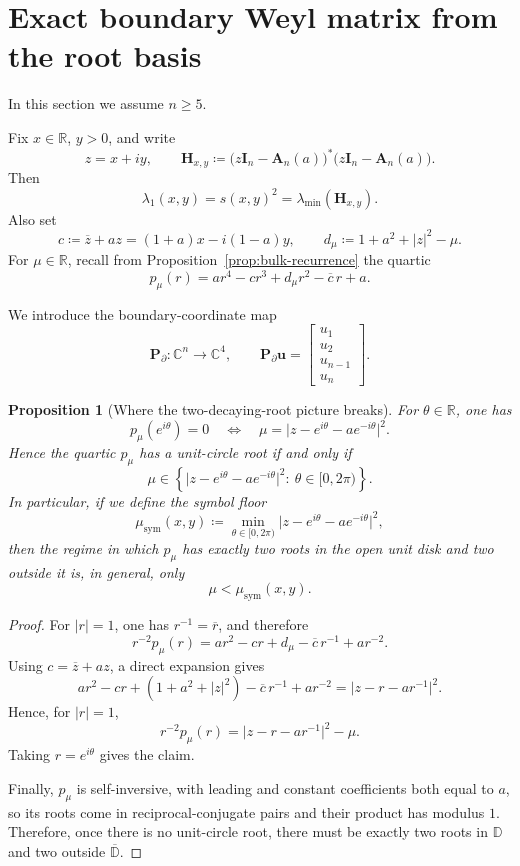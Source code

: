 \documentclass[11pt]{article}
\newtheorem{proposition}[theorem]{Proposition}
\begin{document}
\section{Exact boundary Weyl matrix from the root basis}

In this section we assume \(n\ge 5\).

Fix \(x\in\mathbb R\), \(y>0\), and write
\[
z=x+iy,
\qquad
\mathbf H_{x,y}
\coloneqq
\bigl(z\mathbf I_n-\mathbf A_n(a)\bigr)^*\bigl(z\mathbf I_n-\mathbf A_n(a)\bigr).
\]
Then
\[
\lambda_1(x,y)=s(x,y)^2=\lambda_{\min}(\mathbf H_{x,y}).
\]
Also set
\[
c\coloneqq \overline z + a z = (1+a)x-i(1-a)y,
\qquad
d_\mu\coloneqq 1+a^2+|z|^2-\mu.
\]
For \(\mu\in\mathbb R\), recall from Proposition~\ref{prop:bulk-recurrence} the quartic
\[
p_\mu(r)
=
a r^4-c r^3+d_\mu r^2-\overline c\,r+a.
\]

We introduce the boundary-coordinate map
\[
\mathbf P_\partial:\mathbb C^n\to\mathbb C^4,
\qquad
\mathbf P_\partial \mathbf u=
\begin{bmatrix}
u_1\\
u_2\\
u_{n-1}\\
u_n
\end{bmatrix}.
\]

\begin{proposition}[Where the two-decaying-root picture breaks]\label{prop:symbol-floor}
For \(\theta\in\mathbb R\), one has
\[
p_\mu(e^{i\theta})=0
\quad\Longleftrightarrow\quad
\mu=
\bigl|z-e^{i\theta}-a e^{-i\theta}\bigr|^2.
\]
Hence the quartic \(p_\mu\) has a unit-circle root if and only if
\[
\mu\in
\left\{
\bigl|z-e^{i\theta}-a e^{-i\theta}\bigr|^2:\ \theta\in[0,2\pi)
\right\}.
\]
In particular, if we define the symbol floor
\[
\mu_{\mathrm{sym}}(x,y)
\coloneqq
\min_{\theta\in[0,2\pi)}
\bigl|z-e^{i\theta}-a e^{-i\theta}\bigr|^2,
\]
then the regime in which \(p_\mu\) has exactly two roots in the open unit disk and two outside it is, in general, only
\[
\mu<\mu_{\mathrm{sym}}(x,y).
\]
\end{proposition}

\begin{proof}
For \(|r|=1\), one has \(r^{-1}=\overline r\), and therefore
\[
r^{-2}p_\mu(r)
=
a r^2-c r+d_\mu-\overline c\,r^{-1}+a r^{-2}.
\]
Using \(c=\overline z + a z\), a direct expansion gives
\[
a r^2-c r+(1+a^2+|z|^2)-\overline c\,r^{-1}+a r^{-2}
=
\bigl|z-r-a r^{-1}\bigr|^2.
\]
Hence, for \(|r|=1\),
\[
r^{-2}p_\mu(r)=\bigl|z-r-a r^{-1}\bigr|^2-\mu.
\]
Taking \(r=e^{i\theta}\) gives the claim.

Finally, \(p_\mu\) is self-inversive, with leading and constant coefficients both equal to \(a\), so its roots come in reciprocal-conjugate pairs and their product has modulus \(1\). Therefore, once there is no unit-circle root, there must be exactly two roots in \(\mathbb D\) and two outside \(\overline{\mathbb D}\).
\end{proof}
\end{document}
